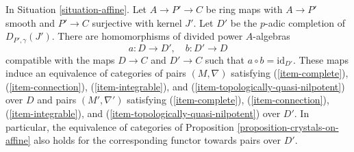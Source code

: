 \begin{lemma}
\label{lemma-crystals-on-affine-smooth}
In Situation \ref{situation-affine}.
Let $A \to P' \to C$ be ring maps with $A \to P'$ smooth and $P' \to C$
surjective with kernel $J'$. Let $D'$ be the $p$-adic completion of
$D_{P', \gamma}(J')$. There are homomorphisms of divided power $A$-algebras
$$
a : D \longrightarrow D',\quad b : D' \longrightarrow D
$$
compatible with the maps $D \to C$ and $D' \to C$ such that
$a \circ b = \text{id}_{D'}$. These maps induce
an equivalence of categories of pairs $(M, \nabla)$ satisfying
(\ref{item-complete}), (\ref{item-connection}),
(\ref{item-integrable}), and (\ref{item-topologically-quasi-nilpotent})
over $D$ and pairs $(M', \nabla')$  satisfying
(\ref{item-complete}), (\ref{item-connection}),
(\ref{item-integrable}), and (\ref{item-topologically-quasi-nilpotent})
over $D'$. In particular, the equivalence of categories of
Proposition \ref{proposition-crystals-on-affine}
also holds for the corresponding functor towards pairs over $D'$.
\end{lemma}

